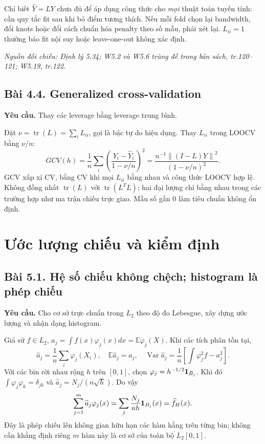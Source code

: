 \documentclass[11pt,a4paper]{article}
\newcommand{\E}{\mathbb E}\newcommand{\Pp}{\mathbb P}
\DeclareMathOperator{\Var}{Var}\DeclareMathOperator{\Cov}{Cov}
\DeclareMathOperator{\tr}{tr}\DeclareMathOperator{\se}{se}
\newcommand{\norm}[1]{\left\lVert#1\right\rVert}
\newcommand{\src}[1]{\textit{Nguồn đối chiếu: #1.}}
\newcommand{\prob}[3]{\subsection{Bài #1. #2}\label{b:#1}\textbf{Yêu cầu.} #3\par}
\begin{document}
\begin{caution}
Chỉ biết $\widehat Y=LY$ chưa đủ để áp dụng công thức cho \emph{mọi} thuật toán tuyến tính: cần quy tắc fit sau khi bỏ điểm tương thích. Nếu mỗi fold chọn lại bandwidth, đổi knots hoặc đổi cách chuẩn hóa penalty theo số mẫu, phải xét lại. $L_{ii}=1$ thường báo fit nội suy hoặc leave-one-out không xác định.
\end{caution}
\src{Định lý 5.34; W5.2 và W5.6 trùng đề trong bản sách, tr.120--121; W5.19, tr.122}

\prob{4.4}{Generalized cross-validation}{Thay các leverage bằng leverage trung bình.}
Đặt $\nu=\tr(L)=\sum_iL_{ii}$, gọi là bậc tự do hiệu dụng. Thay $L_{ii}$ trong LOOCV bằng $\nu/n$:
\[
GCV(h)=\frac1n\sum_i\left(\frac{Y_i-\widehat Y_i}{1-\nu/n}\right)^2
=\frac{n^{-1}\norm{(I-L)Y}^2}{(1-\nu/n)^2}.
\]
GCV xấp xỉ CV, bằng CV khi mọi $L_{ii}$ bằng nhau và công thức LOOCV hợp lệ. Không đồng nhất $\tr(L)$ với $\tr(L^TL)$; hai đại lượng chỉ bằng nhau trong các trường hợp như ma trận chiếu trực giao. Mẫu số gần 0 làm tiêu chuẩn không ổn định.

\section{Ước lượng chiếu và kiểm định}
\prob{5.1}{Hệ số chiếu không chệch; histogram là phép chiếu}{Cho cơ sở trực chuẩn trong $L_2$ theo độ đo Lebesgue, xây dựng ước lượng và nhận dạng histogram.}
Giả sử $f\in L_2$, $a_j=\int f(x)\varphi_j(x)dx=\E\varphi_j(X)$. Khi các tích phân tồn tại,
\[
\widehat a_j=\frac1n\sum_i\varphi_j(X_i),\quad\E\widehat a_j=a_j,\quad
\Var\widehat a_j=\frac1n\left[\int\varphi_j^2f-a_j^2\right].
\]
Với các bin rời nhau rộng $h$ trên $[0,1]$, chọn $\varphi_j=h^{-1/2}\mathbf 1_{B_j}$. Khi đó
$\int\varphi_j\varphi_k=\delta_{jk}$ và $\widehat a_j=N_j/(n\sqrt h)$. Do vậy
\[
\sum_{j=1}^m\widehat a_j\varphi_j(x)=\sum_j\frac{N_j}{nh}\mathbf 1_{B_j}(x)=\widehat f_H(x).
\]
Đây là phép chiếu lên không gian hữu hạn các hàm hằng trên từng bin; không cần khẳng định riêng $m$ hàm này là cơ sở của toàn bộ $L_2[0,1]$.
\end{document}
